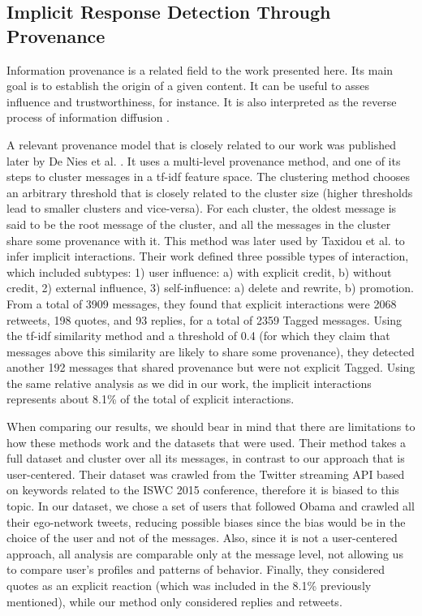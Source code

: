 \subsection{Implicit Response Detection Through Provenance}

Information provenance is a related field to the work presented here. Its main goal is to establish the origin of a given content. It can be useful to asses influence and trustworthiness, for instance. It is also interpreted as the reverse process of information diffusion \cite{taxidou2015}.

A relevant provenance model that is closely related to our work was published later by De Nies et al. \cite{de2015}. It uses a multi-level provenance method, and one of its steps to cluster messages in a tf-idf feature space. The clustering method chooses an arbitrary threshold that is closely related to the cluster size (higher thresholds lead to smaller clusters and vice-versa). For each cluster, the oldest message is said to be the root message of the cluster, and all the messages in the cluster share some provenance with it. This method was later used by Taxidou et al. \cite{taxidou2016} to infer implicit interactions. Their work defined three possible types of interaction, which included subtypes: 1) user influence: a) with explicit credit, b) without credit, 2) external influence, 3) self-influence: a) delete and rewrite, b) promotion. From a total of 3909 messages, they found that explicit interactions were 2068 retweets, 198 quotes, and 93 replies, for a total of 2359 Tagged messages. Using the tf-idf similarity method and a threshold of 0.4 (for which they claim that messages above this similarity are likely to share some provenance), they detected another 192 messages that shared provenance but were not explicit Tagged. Using the same relative analysis as we did in our work, the implicit interactions represents about 8.1\% of the total of explicit interactions.

When comparing our results, we should bear in mind that there are limitations to how these methods work and the datasets that were used. Their method takes a full dataset and cluster over all its messages, in contrast to our approach that is user-centered. Their dataset was crawled from the Twitter streaming API based on keywords related to the ISWC 2015 conference, therefore it is biased to this topic. In our dataset, we chose a set of users that followed Obama and crawled all their ego-network tweets, reducing possible biases since the bias would be in the choice of the user and not of the messages. Also, since it is not a user-centered approach, all analysis are comparable only at the message level, not allowing us to compare user's profiles and patterns of behavior. Finally, they considered quotes as an explicit reaction (which was included in the 8.1\% previously mentioned), while our method only considered replies and retweets.

